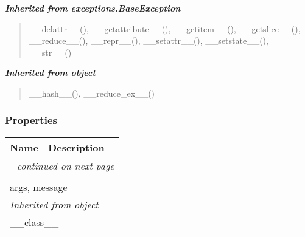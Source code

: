 \large{\textbf{\textit{Inherited from exceptions.BaseException}}}

\begin{quote}
\_\_delattr\_\_(), \_\_getattribute\_\_(), \_\_getitem\_\_(), \_\_getslice\_\_(), \_\_reduce\_\_(), \_\_repr\_\_(), \_\_setattr\_\_(), \_\_setstate\_\_(), \_\_str\_\_()
\end{quote}

\large{\textbf{\textit{Inherited from object}}}

\begin{quote}
\_\_hash\_\_(), \_\_reduce\_ex\_\_()
\end{quote}


  \subsubsection{Properties}

    \vspace{-1cm}
\hspace{\varindent}\begin{longtable}{|p{\varnamewidth}|p{\vardescrwidth}|l}
\cline{1-2}
\cline{1-2} \centering \textbf{Name} & \centering \textbf{Description}& \\
\cline{1-2}
\endhead\cline{1-2}\multicolumn{3}{r}{\small\textit{continued on next page}}\\\endfoot\cline{1-2}
\endlastfoot\multicolumn{2}{|l|}{\textit{Inherited from exceptions.BaseException}}\\
\multicolumn{2}{|p{\varwidth}|}{\raggedright args, message}\\
\cline{1-2}
\multicolumn{2}{|l|}{\textit{Inherited from object}}\\
\multicolumn{2}{|p{\varwidth}|}{\raggedright \_\_class\_\_}\\
\cline{1-2}
\end{longtable}



